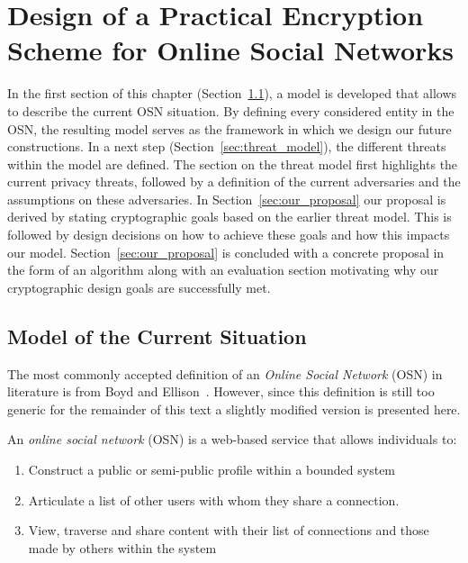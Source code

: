 \chapter{Design of a Practical Encryption Scheme for Online Social Networks}
\label{cha:n}
In the first section of this chapter (Section~\ref{sec:model_of_current_situation}), a model is developed that allows to describe the current OSN situation. By  defining every considered entity in the OSN, the resulting model serves as the framework in which we design our future constructions. In a next step (Section~\ref{sec:threat_model}), the different threats within the model are defined. The section on the threat model first highlights the current privacy threats, followed by a definition of the current adversaries and the assumptions on these adversaries. In Section~\ref{sec:our_proposal} our proposal is derived by stating cryptographic goals based on the earlier threat model. This is followed by design decisions on how to achieve these goals and how this impacts our model. Section~\ref{sec:our_proposal} is concluded with a concrete proposal in the form of an algorithm along with an evaluation section motivating why our cryptographic design goals are successfully met.

\section{Model of the Current Situation}
\label{sec:model_of_current_situation}
The most commonly accepted definition of an \textit{Online Social Network} (OSN) in literature is from Boyd and Ellison~\cite{art:BoydE08}. However, since this definition is still too generic for the remainder of this text a slightly modified version is presented here.

\begin{defn}
\label{def:osn_boyd}
 An \textit{online social network} (OSN) is a web-based service that allows individuals to:
 \begin{enumerate}
  \item Construct a public or semi-public profile within a bounded system
  \item Articulate a list of other users with whom they share a connection.
  \item View, traverse and share content with their list of connections and those made by others within the system
  \setcounter{enumTemp}{\theenumi}
 \end{enumerate}
\end{defn}

